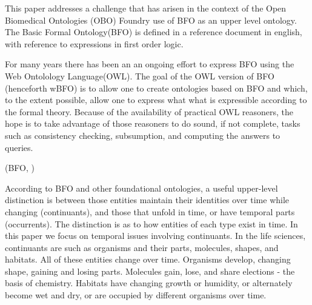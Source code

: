 


This paper addresses a challenge that has arisen in the context of the
Open Biomedical Ontologies (OBO) Foundry \cite{Smith2007} use of BFO
as an upper level ontology. The Basic Formal Ontology(BFO) is defined
in a reference document \cite{BF02:reference} in english, with
reference to expressions in first order logic.

For many years there has been an an ongoing effort to express BFO
using the Web Ontolology Language(OWL). The goal of the OWL version of
BFO (henceforth wBFO) is to allow one to create ontologies based on
BFO and which, to the extent possible, allow one to express what what
is expressible according to the formal theory. Because of the
availability of practical OWL reasoners, the hope is to take advantage
of those reasoners to do sound, if not complete, tasks such as
consistency checking, subsumption, and computing the answers to
queries.



(BFO, \cite{BFO2:Graz})



According to BFO and other foundational ontologies, a useful
upper-level distinction is between those entities maintain their
identities over time while changing (continuants), and those that
unfold in time, or have temporal parts (occurrents).  The distinction
is as to how entities of each type exist in time.  In this paper we
focus on temporal issues involving continuants.  In the life sciences,
continuants are such as organisms and their parts, molecules, shapes, and
habitats. All of these entities change over time. Organisms develop,
changing shape, gaining and losing parts. Molecules gain, lose, and
share elections - the basis of chemistry. Habitats have changing
growth or humidity, or alternately become wet and dry, or are occupied
by different organisms over time.


